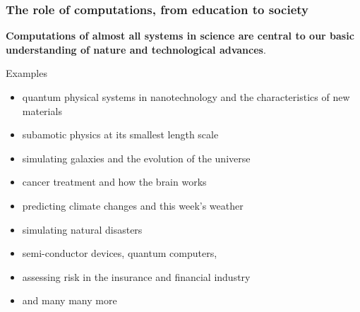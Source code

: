 \documentclass{beamer}
\begin{document}
\begin{frame}
\frametitle{The role of computations, from education to society}

\begin{block}{}
\textbf{Computations of almost all systems in science are central to our
basic understanding of nature and technological advances}.
\end{block}
\begin{block}{Examples }
\begin{itemize}
\item quantum physical systems in nanotechnology and the characteristics of new materials

\item subamotic physics at its smallest length scale

\item simulating galaxies and the evolution of the universe

\item cancer treatment and how the brain works

\item predicting climate changes and this week's weather

\item simulating natural disasters

\item semi-conductor devices, quantum computers,

\item assessing risk in the insurance and financial industry

\item and many many more
\end{itemize}

\noindent
\end{block}
\end{frame}
\end{document}

